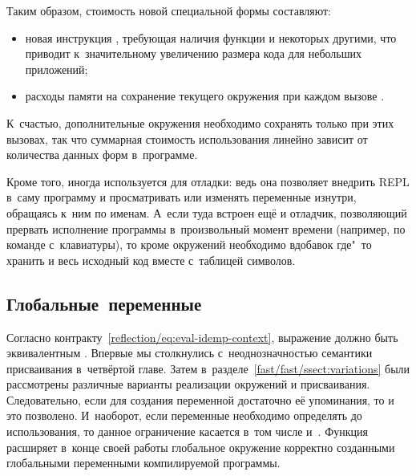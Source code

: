 Таким образом, стоимость новой специальной формы составляют:

\begin{itemize}
  \item новая инструкция , требующая наличия
        функции  и некоторых другими, что приводит
        к~значительному увеличению размера кода для небольших
        приложений;

  \item расходы памяти на сохранение текущего окружения при каждом
        вызове .
\end{itemize}

\noindent
К~счастью, дополнительные окружения необходимо сохранять только при этих
вызовах, так что суммарная стоимость использования  линейно зависит
от количества данных форм в~программе.

Кроме того,  иногда используется для отладки: ведь она позволяет
внедрить REPL в~саму программу и просматривать или изменять переменные изнутри,
обращаясь к~ним по именам. А~если туда встроен ещё и отладчик, позволяющий
прервать исполнение программы в~произвольный момент времени (например, по
команде с~клавиатуры), то кроме окружений необходимо вдобавок где"~то хранить и
весь исходный код вместе с~таблицей символов.


\subsection{Глобальные~переменные}%
\label{reflection/eval-as-spec-form/ssect:global}

Согласно контракту~\eqref{reflection/eq:eval-idemp-context}, выражение  должно быть эквивалентным . Впервые мы
столкнулись с~неоднозначностью семантики присваивания в~четвёртой главе.
 Затем в~разделе~\ref{fast/fast/ssect:variations}
были рассмотрены различные варианты реализации окружений и присваивания.
 Следовательно, если для создания переменной
достаточно её упоминания, то и  это позволено. И~наоборот, если
переменные необходимо определять до использования, то данное ограничение
касается в~том числе и~. Функция  расширяет
в~конце своей работы глобальное окружение корректно созданными глобальными
переменными компилируемой программы.

